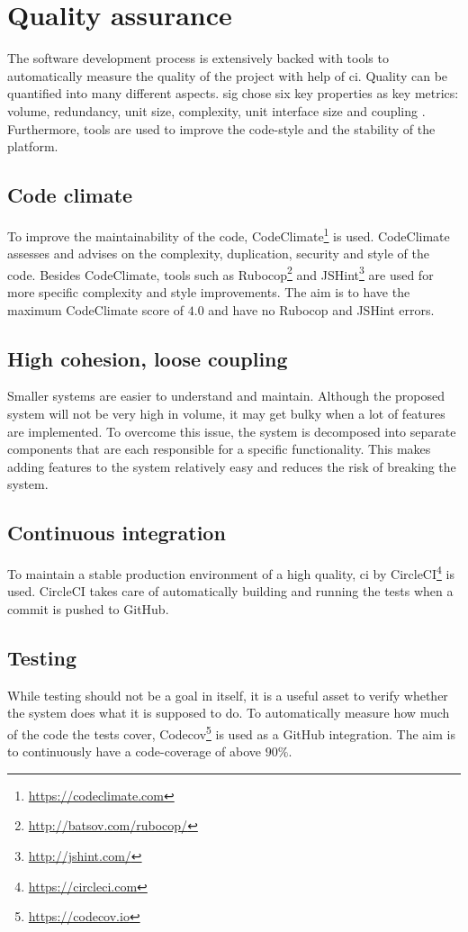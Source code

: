 \section{Quality assurance}
The software development process is extensively backed with tools to automatically measure the quality of the project with help of \gls{ci}. Quality can be quantified into many different aspects. \Gls{sig} chose six key properties as key metrics: volume, redundancy, unit size, complexity, unit interface size and coupling . Furthermore, tools are used to improve the code-style and the stability of the platform.

\subsection{Code climate}
To improve the maintainability of the code, CodeClimate\footnote{\url{https://codeclimate.com}} is used. CodeClimate assesses and advises on the complexity, duplication, security and style of the code. Besides CodeClimate, tools such as Rubocop\footnote{\url{http://batsov.com/rubocop/}} and JSHint\footnote{\url{http://jshint.com/}} are used for more specific complexity and style improvements. The aim is to have the maximum CodeClimate score of $4.0$ and have no Rubocop and JSHint errors.

\subsection{High cohesion, loose coupling}
Smaller systems are easier to understand and maintain. Although the proposed system will not be very high in volume, it may get bulky when a lot of features are implemented. To overcome this issue, the system is decomposed into separate components that are each responsible for a specific functionality. This makes adding features to the system relatively easy and reduces the risk of breaking the system.

\subsection{Continuous integration}
To maintain a stable production environment of a high quality, \gls{ci} by CircleCI\footnote{\url{https://circleci.com}} is used. CircleCI takes care of automatically building and running the tests when a commit is pushed to GitHub.

\subsection{Testing}
While testing should not be a goal in itself, it is a useful asset to verify whether the system does what it is supposed to do. To automatically measure how much of the code the tests cover, Codecov\footnote{\url{https://codecov.io}} is used as a GitHub integration. The aim is to continuously have a code-coverage of above $90\%$.


